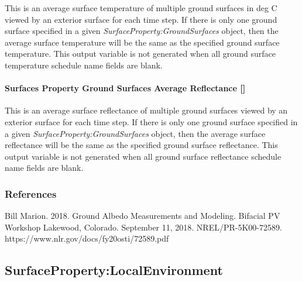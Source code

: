 This is an average surface temperature of multiple ground surfaces in deg C viewed by an exterior surface for each time step. If there is only one ground surface specified in a given \textit{SurfaceProperty:GroundSurfaces} object, then the average surface temperature will be the same as the specified ground surface temperature. This output variable is not generated when all ground surface temperature schedule name fields are blank.

\paragraph{Surfaces Property Ground Surfaces Average Reflectance {[]}}\label{surfaces-property-ground-surfaces-average-reflectance}

This is an average surface reflectance of multiple ground surfaces viewed by an exterior surface for each time step. If there is only one ground surface specified in a given \textit{SurfaceProperty:GroundSurfaces} object, then the average surface reflectance will be the same as the specified ground surface reflectance. This output variable is not generated when all ground surface reflectance schedule name fields are blank.

\subsubsection{References}\label{references-gnd-srfs}

Bill Marion. 2018. Ground Albedo Measurements and Modeling. Bifacial PV Workshop Lakewood, Colorado. September 11, 2018.
NREL/PR-5K00-72589. https://www.nlr.gov/docs/fy20osti/72589.pdf

\subsection{SurfaceProperty:LocalEnvironment}\label{surfacePropertylocalEnvironment}


